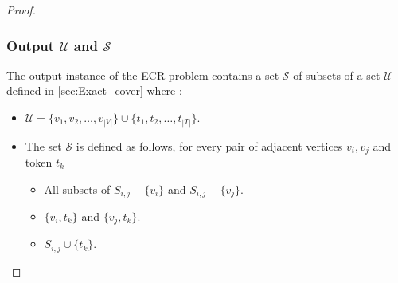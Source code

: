 \begin{proof}
\subsubsection{Output $\mathcal{U}$ and $\mathcal{S}$}\label{subsubsection:output_instance}
The output instance of the ECR problem contains a set $\mathcal{S}$ of subsets of a set $\mathcal{U}$ defined in
\ref{sec:Exact_cover} where :
\begin{itemize}
  \item $\mathcal{U} = \{v_1, v_2, \dots, v_{|V|}\} \cup \{t_1, t_2, \dots, t_{|T|}\}.$
  \item The set $\mathcal{S}$ is defined as follows, for every pair of adjacent vertices $v_i, v_j$ and token $t_k$
  \begin{itemize}
    \item All subsets of $S_{i,j} - \{v_i\}$ and $S_{i,j} - \{v_j\}$.
    \item $\{v_i, t_k\}$ and $\{v_j , t_k\}$.
    \item $S_{i,j} \cup \{t_k\}$.
  \end{itemize}
\end{itemize}


\end{proof}
